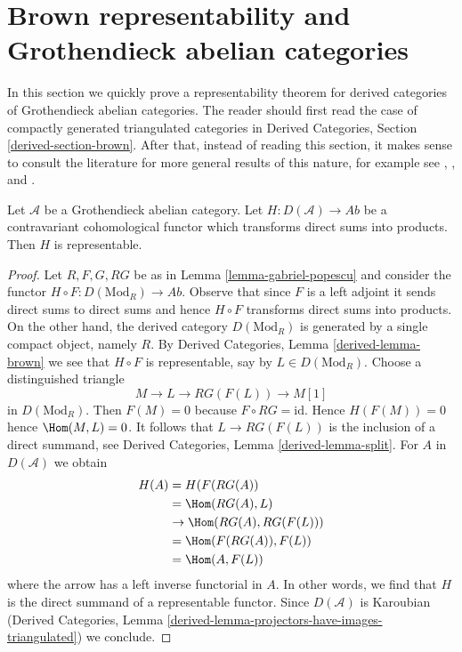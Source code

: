 \section{Brown representability and Grothendieck abelian categories}
\label{section-brown}

\noindent
In this section we quickly prove a representability theorem for
derived categories of Grothendieck abelian categories. The reader should
first read the case of compactly generated triangulated categories in
Derived Categories, Section \ref{derived-section-brown}.
After that, instead of reading this section,
it makes sense to consult the literature for more
general results of this nature, for example see
\cite{Franke}, \cite{Neeman}, and \cite{Krause}.

\begin{lemma}
\label{lemma-brown}
Let $\mathcal{A}$ be a Grothendieck abelian category.
Let $H : D(\mathcal{A}) \to \textit{Ab}$ be a contravariant
cohomological functor which transforms direct sums into products.
Then $H$ is representable.
\end{lemma}

\begin{proof}
Let $R, F, G, RG$ be as in Lemma \ref{lemma-gabriel-popescu}
and consider the functor $H \circ F : D(\text{Mod}_R) \to \textit{Ab}$.
Observe that since $F$ is a left adjoint it sends direct sums to
direct sums and hence $H \circ F$ transforms direct sums into products.
On the other hand, the derived category $D(\text{Mod}_R)$ is
generated by a single compact object, namely $R$.
By Derived Categories, Lemma \ref{derived-lemma-brown}
we see that $H \circ F$ is representable, say by $L \in D(\text{Mod}_R)$.
Choose a distinguished triangle
$$
M \to L \to RG(F(L)) \to M[1]
$$
in $D(\text{Mod}_R)$. Then $F(M) = 0$ because $F \circ RG = \text{id}$.
Hence $H(F(M)) = 0$ hence $\Hom(M, L) = 0$.
It follows that $L \to RG(F(L))$ is the inclusion of a direct summand, see
Derived Categories, Lemma \ref{derived-lemma-split}.
For $A$ in $D(\mathcal{A})$ we obtain
\begin{align*}
H(A)
& =
H(F(RG(A)) \\
& =
\Hom(RG(A), L) \\
& \to
\Hom(RG(A), RG(F(L))) \\
& =
\Hom(F(RG(A)), F(L)) \\
& =
\Hom(A, F(L))
\end{align*}
where the arrow has a left inverse functorial in $A$. In other words, we find
that $H$ is the direct summand of a representable functor.
Since $D(\mathcal{A})$ is Karoubian
(Derived Categories, Lemma
\ref{derived-lemma-projectors-have-images-triangulated}) we conclude.
\end{proof}

